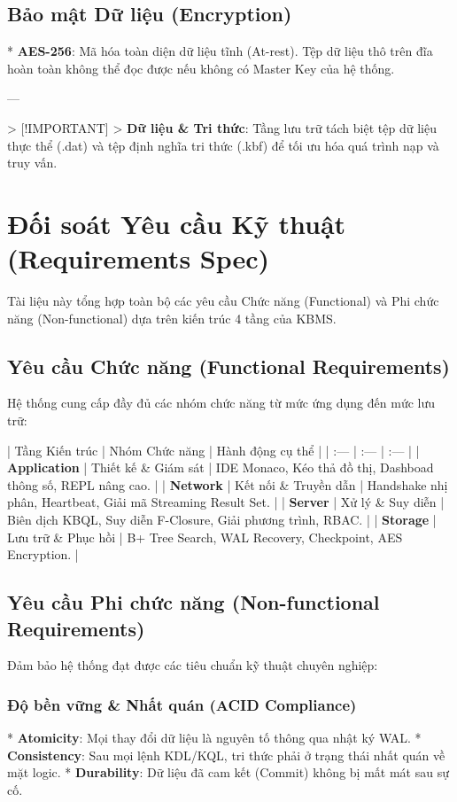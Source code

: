\subsection{Bảo mật Dữ liệu (Encryption)}

*   \textbf{AES-256}: Mã hóa toàn diện dữ liệu tĩnh (At-rest). Tệp dữ liệu thô trên đĩa hoàn toàn không thể đọc được nếu không có Master Key của hệ thống.

---

> [!IMPORTANT]
> \textbf{Dữ liệu \& Tri thức}: Tầng lưu trữ tách biệt tệp dữ liệu thực thể (.dat) và tệp định nghĩa tri thức (.kbf) để tối ưu hóa quá trình nạp và truy vấn.

\section{Đối soát Yêu cầu Kỹ thuật (Requirements Spec)}

Tài liệu này tổng hợp toàn bộ các yêu cầu Chức năng (Functional) và Phi chức năng (Non-functional) dựa trên kiến trúc 4 tầng của KBMS.

\subsection{Yêu cầu Chức năng (Functional Requirements)}

Hệ thống cung cấp đầy đủ các nhóm chức năng từ mức ứng dụng đến mức lưu trữ:

| Tầng Kiến trúc | Nhóm Chức năng | Hành động cụ thể |
| :--- | :--- | :--- |
| \textbf{Application} | Thiết kế \& Giám sát | IDE Monaco, Kéo thả đồ thị, Dashboad thông số, REPL nâng cao. |
| \textbf{Network} | Kết nối \& Truyền dẫn | Handshake nhị phân, Heartbeat, Giải mã Streaming Result Set. |
| \textbf{Server} | Xử lý \& Suy diễn | Biên dịch KBQL, Suy diễn F-Closure, Giải phương trình, RBAC. |
| \textbf{Storage} | Lưu trữ \& Phục hồi | B+ Tree Search, WAL Recovery, Checkpoint, AES Encryption. |

\subsection{Yêu cầu Phi chức năng (Non-functional Requirements)}

Đảm bảo hệ thống đạt được các tiêu chuẩn kỹ thuật chuyên nghiệp:

\subsubsection{Độ bền vững & Nhất quán (ACID Compliance)}
*   \textbf{Atomicity}: Mọi thay đổi dữ liệu là nguyên tố thông qua nhật ký WAL.
*   \textbf{Consistency}: Sau mọi lệnh KDL/KQL, tri thức phải ở trạng thái nhất quán về mặt logic.
*   \textbf{Durability}: Dữ liệu đã cam kết (Commit) không bị mất mát sau sự cố.

